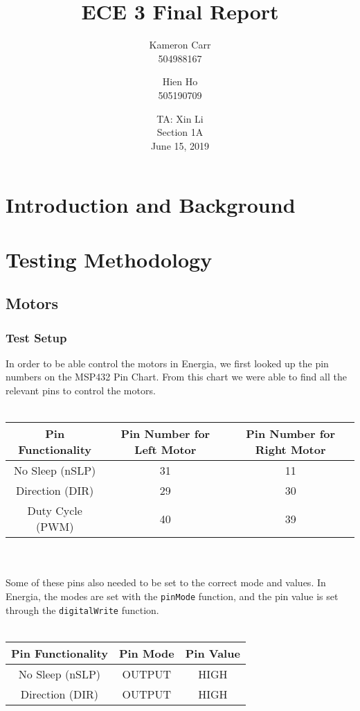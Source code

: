 \documentclass[12pt]{article}
\title{ECE 3 Final Report}
\author{Kameron Carr \\ 504988167 \and Hien Ho \\ 505190709}
\date{TA: Xin Li \\ Section 1A \\ June 15, 2019}
\begin{document}
\maketitle

\section{Introduction and Background}

\section{Testing Methodology}
\subsection{Motors}
\subsubsection{Test Setup}
In order to be able control the motors in Energia, we first looked up the pin numbers on the MSP432 Pin Chart. From this chart we were able to find all the relevant pins to control the motors. \\ \\
\begin{tabu}{|c|c|c|}
\hline
\textbf{Pin Functionality} & \textbf{Pin Number for Left Motor} & \textbf{Pin Number for Right Motor} \\ \hline
No Sleep (nSLP) & 31 & 11 \\
Direction (DIR) & 29 & 30 \\
Duty Cycle (PWM) & 40 & 39 \\
\hline
\end{tabu} \\ \\
Some of these pins also needed to be set to the correct mode and values. In Energia, the modes are set with the \texttt{pinMode} function, and the pin value is set through the \texttt{digitalWrite} function. \\ \\
\begin{tabu}{|c|c|c|}
\hline
\textbf{Pin Functionality} & \textbf{Pin Mode} & \textbf{Pin Value} \\ \hline
No Sleep (nSLP) & OUTPUT & HIGH \\
Direction (DIR) & OUTPUT & HIGH \\
\hline
\end{tabu} \\ \\
\end{document}
